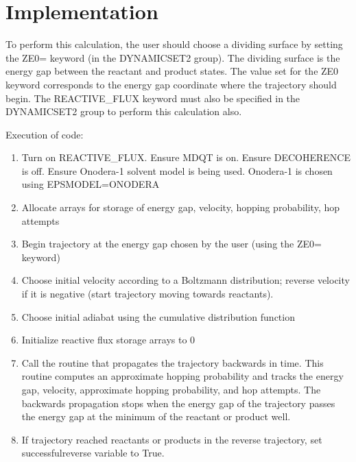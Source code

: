 \documentclass[aps,amsfonts,amsmath,amssymb,onecolumn,tightenlines,notitlepage]{revtex4-2}
\begin{document}
\section{Implementation}
%
To perform this calculation, the user should choose a dividing surface by setting the {\ttfamily ZE0=} keyword (in the {\ttfamily DYNAMICSET2} group). The dividing surface is the energy gap between the reactant and product states. The value set for the {\ttfamily ZE0} keyword corresponds to the energy gap coordinate where the trajectory should begin. The {\ttfamily REACTIVE\_FLUX} keyword must also be specified in the {\ttfamily DYNAMICSET2} group to perform this calculation also.

Execution of code:
\begin{enumerate}

\item Turn on {\ttfamily REACTIVE\_FLUX}. Ensure {\ttfamily MDQT} is on.  Ensure {\ttfamily DECOHERENCE} is off. Ensure Onodera-1 solvent model is being used. Onodera-1 is chosen using {\ttfamily EPSMODEL=ONODERA}

\item Allocate arrays for storage of energy gap, velocity, hopping probability, hop attempts

\item Begin trajectory at the energy gap chosen by the user (using the {\ttfamily ZE0=} keyword) 

\item Choose initial velocity according to a Boltzmann distribution; reverse velocity if it is negative (start trajectory moving towards reactants).

\item Choose initial adiabat using the cumulative distribution function

\item Initialize reactive flux storage arrays to 0

\item Call the routine that propagates the trajectory backwards in time. This routine computes an approximate hopping probability and tracks the energy gap, velocity, approximate hopping probability, and hop attempts. The backwards propagation stops when the energy gap of the trajectory passes the energy gap at the minimum of the reactant or product well.

\item If trajectory reached reactants or products in the reverse trajectory, set {\ttfamily successfulreverse} variable to {\ttfamily True}. 


\end{enumerate}
\end{document}
